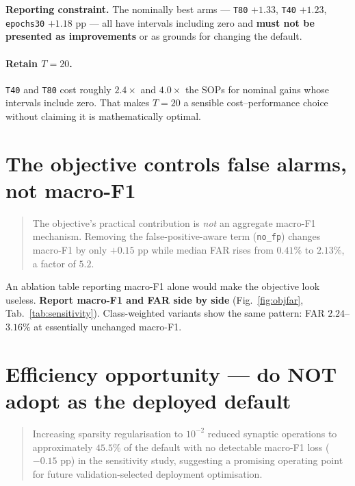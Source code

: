 \noindent\textbf{Reporting constraint.} The nominally best arms --- \texttt{T80}
$+1.33$, \texttt{T40} $+1.23$, \texttt{epochs30} $+1.18$ pp --- all have intervals
including zero and \textbf{must not be presented as improvements} or as grounds for
changing the default.

\paragraph{Retain $T=20$.} \texttt{T40} and \texttt{T80} cost roughly $2.4\times$ and
$4.0\times$ the SOPs for nominal gains whose intervals include zero. That makes
$T=20$ a sensible cost--performance choice without claiming it is mathematically
optimal.

\section*{The objective controls false alarms, not macro-F1}

\begin{quote}
The objective's practical contribution is \emph{not} an aggregate macro-F1 mechanism.
Removing the false-positive-aware term (\texttt{no\_fp}) changes macro-F1 by only
$+0.15$ pp while median FAR rises from $0.41\%$ to $2.13\%$, a factor of $5.2$.
\end{quote}

\noindent An ablation table reporting macro-F1 alone would make the objective look
useless. \textbf{Report macro-F1 and FAR side by side} (Fig.~\ref{fig:objfar},
Tab.~\ref{tab:sensitivity}). Class-weighted variants show the same pattern: FAR
$2.24$--$3.16\%$ at essentially unchanged macro-F1.

\section*{Efficiency opportunity --- do NOT adopt as the deployed default}

\begin{quote}
Increasing sparsity regularisation to $10^{-2}$ reduced synaptic operations to
approximately $45.5\%$ of the default with no detectable macro-F1 loss
($-0.15$ pp) in the sensitivity study, suggesting a promising operating point for
future validation-selected deployment optimisation.
\end{quote}

